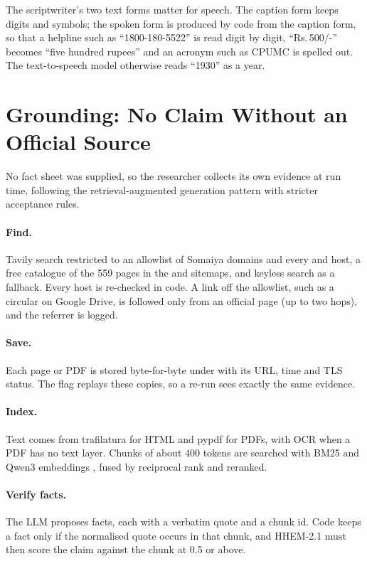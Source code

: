 \documentclass[twoside,11pt]{article}
\begin{document}
The scriptwriter's two text forms matter for speech. The caption form keeps digits and symbols; the spoken form is produced by code from the caption form, so that a helpline such as ``1800-180-5522'' is read digit by digit, ``Rs.\,500/-'' becomes ``five hundred rupees'' and an acronym such as CPUMC is spelled out. The text-to-speech model otherwise reads ``1930'' as a year.

\section{Grounding: No Claim Without an Official Source}
\label{sec:grounding}

No fact sheet was supplied, so the researcher collects its own evidence at run time, following the retrieval-augmented generation pattern \citep{lewis2020rag} with stricter acceptance rules.

\paragraph{Find.} Tavily search \citep{tavily2026} restricted to an allowlist of Somaiya domains and every  and  host, a free catalogue of the 559 pages in the  and  sitemaps, and keyless search as a fallback. Every host is re-checked in code. A link off the allowlist, such as a circular on Google Drive, is followed only from an official page (up to two hops), and the referrer is logged.

\paragraph{Save.} Each page or PDF is stored byte-for-byte under  with its URL, time and TLS status. The  flag replays these copies, so a re-run sees exactly the same evidence.

\paragraph{Index.} Text comes from trafilatura for HTML \citep{barbaresi2021trafilatura} and pypdf for PDFs, with OCR when a PDF has no text layer. Chunks of about 400 tokens are searched with BM25 \citep{robertson2009bm25,lu2024bm25s} and Qwen3 embeddings \citep{zhang2025qwen3emb}, fused by reciprocal rank \citep{cormack2009rrf} and reranked.

\paragraph{Verify facts.} The LLM proposes facts, each with a verbatim quote and a chunk id. Code keeps a fact only if the normalised quote occurs in that chunk, and HHEM-2.1 \citep{hhem2024} must then score the claim against the chunk at 0.5 or above.
\end{document}
